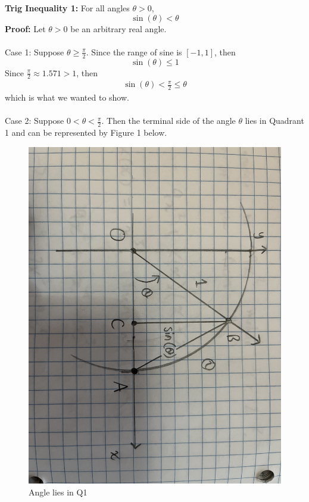 \documentclass{article}
\begin{document}
	\textbf{Trig Inequality 1:} For all angles $\theta > 0$,
	$$\sin{(\theta)} < \theta$$
	\textbf{Proof:}
	Let $\theta > 0$ be an arbitrary real angle. \\\\
	Case 1: Suppose $\theta \geq \frac{\pi}{2}$. Since the range of sine is $[-1, 1]$, then
	$$\sin{(\theta)} \leq 1$$
	Since $\frac{\pi}{2} \approx 1.571 > 1$, then
	\begin{align*}
		\sin{(\theta)} < \frac{\pi}{2} \leq \theta
	\end{align*}
	which is what we wanted to show. \\\\
	Case 2: Suppose $0 < \theta < \frac{\pi}{2}$. Then the terminal side of the angle $\theta$ lies in Quadrant 1 and can be represented by Figure 1 below.
	\begin{figure}[h!]
		\includegraphics[width=\linewidth]{Trig_Figure.JPG}
		\caption{Angle lies in Q1}
	\end{figure} \\
\end{document}
